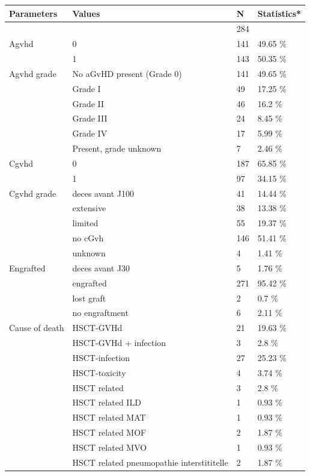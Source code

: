 \documentclass[a4paper,11pt] {article}
\begin{document}
\begin{longtable}{llll}
  \hline
Parameters & Values & N & Statistics* \\ 
  \hline
 &  & 284 &  \\ 
  Agvhd & 0 & 141 & 49.65 \% \\ 
   & 1 & 143 & 50.35 \% \\ 
  Agvhd grade & No aGvHD present (Grade 0) & 141 & 49.65 \% \\ 
   & Grade I & 49 & 17.25 \% \\ 
   & Grade II & 46 & 16.2 \% \\ 
   & Grade III & 24 & 8.45 \% \\ 
   & Grade IV & 17 & 5.99 \% \\ 
   & Present, grade unknown & 7 & 2.46 \% \\ 
  Cgvhd & 0 & 187 & 65.85 \% \\ 
   & 1 & 97 & 34.15 \% \\ 
  Cgvhd grade & deces avant J100 & 41 & 14.44 \% \\ 
   & extensive & 38 & 13.38 \% \\ 
   & limited & 55 & 19.37 \% \\ 
   & no cGvh & 146 & 51.41 \% \\ 
   & unknown & 4 & 1.41 \% \\ 
  Engrafted & deces avant J30 & 5 & 1.76 \% \\ 
   & engrafted & 271 & 95.42 \% \\ 
   & lost graft & 2 & 0.7 \% \\ 
   & no engraftment & 6 & 2.11 \% \\ 
  Cause of death & HSCT-GVHd & 21 & 19.63 \% \\ 
   & HSCT-GVHd + infection & 3 & 2.8 \% \\ 
   & HSCT-infection & 27 & 25.23 \% \\ 
   & HSCT-toxicity & 4 & 3.74 \% \\ 
   & HSCT related & 3 & 2.8 \% \\ 
   & HSCT related ILD & 1 & 0.93 \% \\ 
   & HSCT related MAT & 1 & 0.93 \% \\ 
   & HSCT related MOF & 2 & 1.87 \% \\ 
   & HSCT related MVO & 1 & 0.93 \% \\ 
   & HSCT related pneumopathie interstititelle & 2 & 1.87 \% \\ 

\end{longtable}
\end{document}
